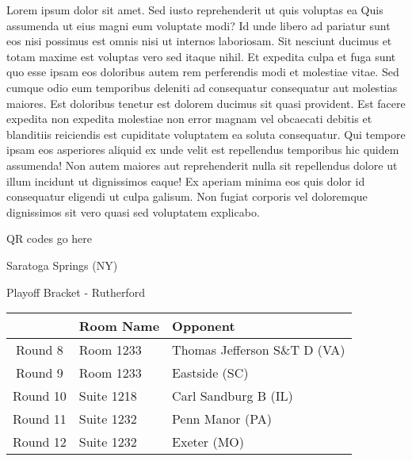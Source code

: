 \documentclass{article}%
\begin{document}
\vspace*{8pt}%
\linebreak%
\newline%
\newline%
Lorem ipsum dolor sit amet. Sed iusto reprehenderit ut quis voluptas ea Quis assumenda ut eius magni eum voluptate modi? Id unde libero ad pariatur sunt eos nisi possimus est omnis nisi ut internos laboriosam. Sit nesciunt ducimus et totam maxime est voluptas vero sed itaque nihil. Et expedita culpa et fuga sunt quo esse ipsam eos doloribus autem rem perferendis modi et molestiae vitae.\newline%
\newline%
Sed cumque odio eum temporibus deleniti ad consequatur consequatur aut molestias maiores. Est doloribus tenetur est dolorem ducimus sit quasi provident. Est facere expedita non expedita molestiae non error magnam vel obcaecati debitis et blanditiis reiciendis est cupiditate voluptatem ea soluta consequatur. Qui tempore ipsam eos asperiores aliquid ex unde velit est repellendus temporibus hic quidem assumenda!\newline%
\newline%
Non autem maiores aut reprehenderit nulla sit repellendus dolore ut illum incidunt ut dignissimos eaque! Ex aperiam minima eos quis dolor id consequatur eligendi ut culpa galisum. Non fugiat corporis vel doloremque dignissimos sit vero quasi sed voluptatem explicabo.\newline%
\newline%
%
\vspace*{30pt}%
\begin{center}%
\begin{Huge}%
QR codes go here%
\end{Huge}%
\end{center}%
\newpage%
\begin{center}%
\begin{Huge}%
Saratoga Springs (NY)%
\end{Huge}%
\vspace*{8pt}%
\linebreak%
\begin{Large}%
Playoff Bracket {-} Rutherford%
\end{Large}%
\end{center}%
%
\begin{tabularx}{\textwidth}{|c|Y|Y|}%
\hline%
&Room Name&Opponent\\%
\hline%
Round 8&Room 1233&Thomas Jefferson S\&T D (VA)\\%
Round 9&Room 1233&Eastside (SC)\\%
Round 10&Suite 1218&Carl Sandburg B (IL)\\%
Round 11&Suite 1232&Penn Manor (PA)\\%
Round 12&Suite 1232&Exeter (MO)\\%
\hline%
\end{tabularx}%
\end{document}
